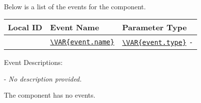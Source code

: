  \\
\par Below is a list of the events for the  component.

\begin{xltabular}{\textwidth}{ | c | l | X | }
  \hline
  \textbf{Local ID} & \textbf{Event Name} & \textbf{Parameter Type} \\ \hline
  \texttt{} &
  \texttt{\url{\VAR{event.name}}} &
  \texttt{\url{\VAR{event.type}}}
  \texttt{-}
  \\ \hline
\end{xltabular}
\vspace{5mm} %

Event Descriptions:
\begin{spaceditemize}
  \item \textbf{\texttt{}} - 
    \textit{No description provided.}
\end{spaceditemize}
\vspace{5mm} %
\par The  component has no events.
